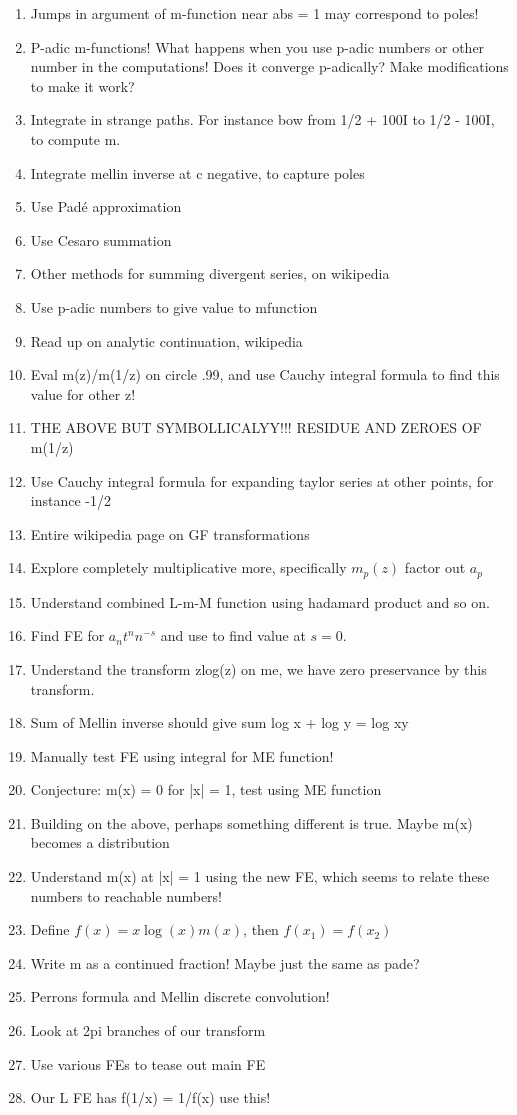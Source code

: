 \documentclass[a4paper]{amsart}
\begin{document}
\begin{enumerate}
  \item Jumps in argument of m-function near abs = 1 may correspond to poles!
  \item P-adic m-functions! What happens when you use p-adic numbers or other number in the computations! Does it converge p-adically? Make modifications to make it work?
  \item Integrate in strange paths. For instance bow from 1/2 + 100I to 1/2 - 100I, to compute m.
  \item Integrate mellin inverse at c negative, to capture poles
  \item Use Padé approximation
  \item Use Cesaro summation
  \item Other methods for summing divergent series, on wikipedia
  \item Use p-adic numbers to give value to mfunction
  \item Read up on analytic continuation, wikipedia
  \item Eval m(z)/m(1/z) on circle .99, and use Cauchy integral formula to find this value for other z!
  \item THE ABOVE BUT SYMBOLLICALYY!!! RESIDUE AND ZEROES OF m(1/z)
  \item Use Cauchy integral formula for expanding taylor series at other points, for instance -1/2
  \item Entire wikipedia page on GF transformations
  \item Explore completely multiplicative more, specifically $m_p(z)$ factor out $a_p$
  \item Understand combined L-m-M function using hadamard product and so on.
  \item Find FE for $a_nt^nn^{-s}$ and use to find value at $s = 0$.
  \item Understand the transform zlog(z) on me, we have zero preservance by this transform.
  \item Sum of Mellin inverse should give sum log x + log y = log xy
  \item Manually test FE using integral for ME function!
  \item Conjecture: m(x) = 0 for |x| = 1, test using ME function
  \item Building on the above, perhaps something different is true. Maybe m(x) becomes a distribution
  \item Understand m(x) at |x| = 1 using the new FE, which seems to relate these numbers to reachable numbers!
  \item Define $f(x) = x\log(x)m(x)$, then $f(x_1) = f(x_2)$
  \item Write m as a continued fraction! Maybe just the same as pade?
  \item Perrons formula and Mellin discrete convolution!
  \item Look at 2pi branches of our transform
  \item Use various FEs to tease out main FE
  \item Our L FE has f(1/x) = 1/f(x) use this!

\end{enumerate}
\end{document}
